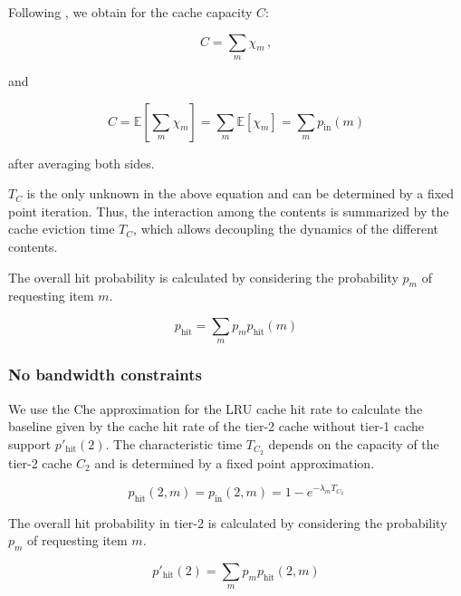 Following \cite{martina2014unified}, we obtain for the cache capacity $C$:

\begin{equation}
	C=\sum_m{\chi_m} \, ,
\end{equation}

and

\begin{equation}
	C=\mathbb{E}\left[\sum_m{\chi_m}\right]=\sum_m{\mathbb{E}\left[\chi_m\right]}=\sum_m{p_\text{in}(m)}
\end{equation}

after averaging both sides.

$T_C$ is the only unknown in the above equation and can be determined by a fixed point iteration.
Thus, the interaction among the contents is summarized by the cache eviction time $T_C$, which allows decoupling the dynamics of the different contents.

The overall hit probability is calculated by considering the probability $p_m$ of requesting item $m$.

\begin{equation}
p_\text{hit}=\sum_m p_m p_\text{hit}(m)
\end{equation}

\subsubsection{No bandwidth constraints}

We use the Che approximation for the LRU cache hit rate to calculate the baseline given by the cache hit rate of the tier-2 cache without tier-1 cache support $p'_\text{hit}(2)$. The characteristic time $T_{C_2}$ depends on the capacity of the tier-2 cache $C_2$ and is determined by a fixed point approximation.

\begin{equation}
p_\text{hit}(2,m)=p_\text{in}(2,m)=1-e^{-\lambda_{m}T_{C_2}}
\end{equation}

The overall hit probability in tier-2 is calculated by considering the probability $p_m$ of requesting item $m$.

\begin{equation}
p'_\text{hit}(2)=\sum_m p_m p_\text{hit}(2,m)
\end{equation}

